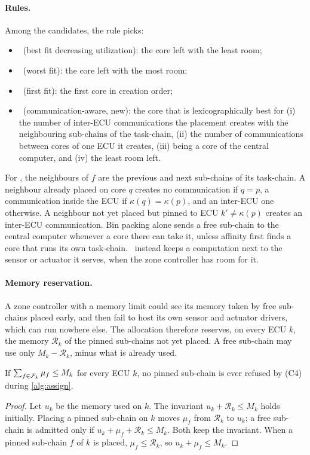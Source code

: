 \paragraph{Rules.} Among the candidates, the rule picks:
\begin{itemize}
\item \BFDU\ (best fit decreasing utilization): the core left with the
least room;
\item \WFDU\ (worst fit): the core left with the most room;
\item \FFDU\ (first fit): the first core in creation order;
\item \CADU\ (communication-aware, new): the core that is lexicographically
best for (i) the number of inter-ECU communications the placement creates
with the neighbouring sub-chains of the task-chain, (ii) the number of
communications between cores of one ECU it creates, (iii) being a core of
the central computer, and (iv) the least room left.
\end{itemize}
For \CADU, the neighbours of $f$ are the previous and next sub-chains of
its task-chain. A neighbour already placed on core $q$ creates no
communication if $q=p$, a communication inside the ECU if $\kappa(q)=
\kappa(p)$, and an inter-ECU one otherwise. A neighbour not yet placed but
pinned to ECU $k'\ne\kappa(p)$ creates an inter-ECU communication. Bin
packing alone sends a free sub-chain to the central computer whenever a
core there can take it, unless affinity first finds a core that runs its
own task-chain. \CADU\ instead keeps a computation next to the sensor or actuator it
serves, when the zone controller has room for it.

\paragraph{Memory reservation.} A zone controller with a memory limit could
see its memory taken by free sub-chains placed early, and then fail to host
its own sensor and actuator drivers, which can run nowhere else. The
allocation therefore reserves, on every ECU $k$, the memory
$\mathcal{R}_k$ of the pinned sub-chains not yet placed. A free sub-chain
may use only $M_k-\mathcal{R}_k$, minus what is already used.

\begin{proposition}[Memory]
\label{prop:memory}
If $\sum_{f\in\mathcal{F}_k}\mu_f\le M_k$ for every ECU $k$, no pinned
sub-chain is ever refused by (C4) during \cref{alg:assign}.
\end{proposition}
\begin{proof}
Let $u_k$ be the memory used on $k$. The invariant $u_k+\mathcal{R}_k\le
M_k$ holds initially. Placing a pinned sub-chain on $k$ moves $\mu_f$ from
$\mathcal{R}_k$ to $u_k$; a free sub-chain is admitted only if $u_k+\mu_f+
\mathcal{R}_k\le M_k$. Both keep the invariant. When a pinned sub-chain $f$
of $k$ is placed, $\mu_f\le\mathcal{R}_k$, so $u_k+\mu_f\le M_k$.
\end{proof}

